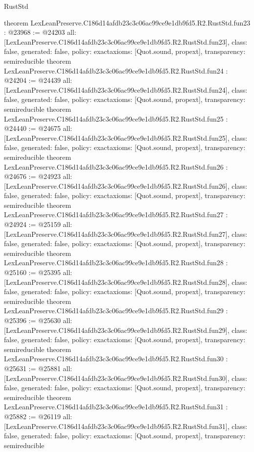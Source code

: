 \begin{lexlean}{RustStd}
\begin{coremodule}
{}
theorem LexLeanPreserve.C186d14afdb23c3c06ac99ce9e1db9fd5.R2.RustStd.fun23 : @23968 := @24203 {
  all: [LexLeanPreserve.C186d14afdb23c3c06ac99ce9e1db9fd5.R2.RustStd.fun23],
  class: false,
  generated: false,
  policy: exact{axioms: [Quot.sound, propext]},
  transparency: semireducible
}
theorem LexLeanPreserve.C186d14afdb23c3c06ac99ce9e1db9fd5.R2.RustStd.fun24 : @24204 := @24439 {
  all: [LexLeanPreserve.C186d14afdb23c3c06ac99ce9e1db9fd5.R2.RustStd.fun24],
  class: false,
  generated: false,
  policy: exact{axioms: [Quot.sound, propext]},
  transparency: semireducible
}
theorem LexLeanPreserve.C186d14afdb23c3c06ac99ce9e1db9fd5.R2.RustStd.fun25 : @24440 := @24675 {
  all: [LexLeanPreserve.C186d14afdb23c3c06ac99ce9e1db9fd5.R2.RustStd.fun25],
  class: false,
  generated: false,
  policy: exact{axioms: [Quot.sound, propext]},
  transparency: semireducible
}
theorem LexLeanPreserve.C186d14afdb23c3c06ac99ce9e1db9fd5.R2.RustStd.fun26 : @24676 := @24923 {
  all: [LexLeanPreserve.C186d14afdb23c3c06ac99ce9e1db9fd5.R2.RustStd.fun26],
  class: false,
  generated: false,
  policy: exact{axioms: [Quot.sound, propext]},
  transparency: semireducible
}
theorem LexLeanPreserve.C186d14afdb23c3c06ac99ce9e1db9fd5.R2.RustStd.fun27 : @24924 := @25159 {
  all: [LexLeanPreserve.C186d14afdb23c3c06ac99ce9e1db9fd5.R2.RustStd.fun27],
  class: false,
  generated: false,
  policy: exact{axioms: [Quot.sound, propext]},
  transparency: semireducible
}
theorem LexLeanPreserve.C186d14afdb23c3c06ac99ce9e1db9fd5.R2.RustStd.fun28 : @25160 := @25395 {
  all: [LexLeanPreserve.C186d14afdb23c3c06ac99ce9e1db9fd5.R2.RustStd.fun28],
  class: false,
  generated: false,
  policy: exact{axioms: [Quot.sound, propext]},
  transparency: semireducible
}
theorem LexLeanPreserve.C186d14afdb23c3c06ac99ce9e1db9fd5.R2.RustStd.fun29 : @25396 := @25630 {
  all: [LexLeanPreserve.C186d14afdb23c3c06ac99ce9e1db9fd5.R2.RustStd.fun29],
  class: false,
  generated: false,
  policy: exact{axioms: [Quot.sound, propext]},
  transparency: semireducible
}
theorem LexLeanPreserve.C186d14afdb23c3c06ac99ce9e1db9fd5.R2.RustStd.fun30 : @25631 := @25881 {
  all: [LexLeanPreserve.C186d14afdb23c3c06ac99ce9e1db9fd5.R2.RustStd.fun30],
  class: false,
  generated: false,
  policy: exact{axioms: [Quot.sound, propext]},
  transparency: semireducible
}
theorem LexLeanPreserve.C186d14afdb23c3c06ac99ce9e1db9fd5.R2.RustStd.fun31 : @25882 := @26119 {
  all: [LexLeanPreserve.C186d14afdb23c3c06ac99ce9e1db9fd5.R2.RustStd.fun31],
  class: false,
  generated: false,
  policy: exact{axioms: [Quot.sound, propext]},
  transparency: semireducible
}
\end{coremodule}
\end{lexlean}
